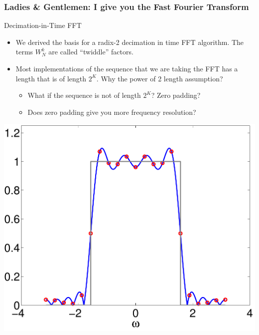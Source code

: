 \documentclass[mathserif,9pt,handout]{beamer}
\begin{document}
\begin{frame}\frametitle{Ladies \& Gentlemen: I give you the Fast Fourier Transform}\small
  \begin{block}{Decimation-in-Time FFT}
    \begin{itemize}
      \item We derived the basis for a radix-2 decimation in time FFT algorithm. The terms $W_N^{k}$ are called ``twiddle'' factors. 
      \item Most implementations of the sequence that we are taking the FFT has a length that is of length $2^K$. Why the power of 2 length assumption?
        \begin{itemize}
          \item What if the sequence is not of length $2^K$? Zero padding?
          \item Does zero padding give you more frequency resolution?
        \end{itemize}
    \end{itemize}
  \end{block}
  \begin{center}
      \includegraphics[height=.4\textheight]{sampling_dtft.pdf}
    \end{center}
\end{frame}
\end{document}
